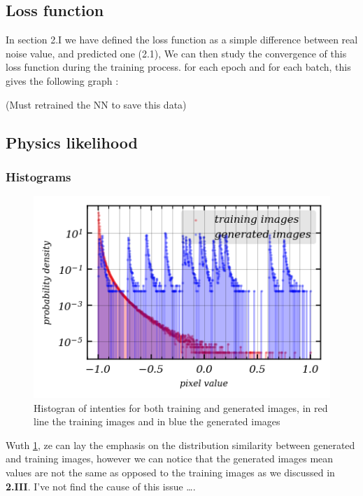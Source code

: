 \documentclass[11pt,a4paper]{report}
\begin{document}
\begin{multicols*}{2}
    \subsection{Loss function}
    In section 2.I we have defined the loss function as a simple difference between real noise value, and predicted one (2.1), We can then study the convergence of this loss function during the training process. for each epoch and for each batch, this gives the following graph :

    (Must retrained the NN to save this data)
    \subsection{Physics likelihood}
    \subsubsection{Histograms}

    \begin{figure}[H]
        \begin{small}
            \begin{center}
                \includegraphics[width=0.95\linewidth]{figure/hist.png}
            \end{center}
            \caption{Histogran of intenties for both training and generated images, in red line the training images and in blue the generated images}
            \label{fig:hist}
        \end{small}
    \end{figure}
    Wuth \ref{fig:hist}, ze can lay the emphasis on the distribution similarity between generated and training images, however we can notice that the generated images mean values are not the same as opposed to the training images as we discussed in \textbf{2.III}. I've not find the cause of this issue \dots.


\end{multicols*}
\end{document}
